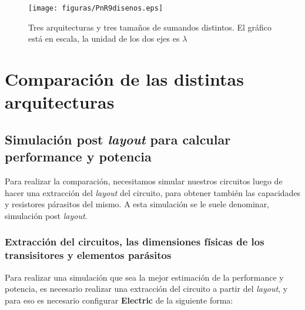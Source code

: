 \begin{figure}
\centering
\texttt{[image: figuras/PnR9disenos.eps]}
  \caption{Tres arquitecturas y tres tamaños de sumandos distintos. El gráfico está en escala, la unidad de los dos ejes es $\lambda$}
  \label{fig:diseños}
\end{figure}

\section{Comparación de las distintas arquitecturas}

\subsection{Simulación post \emph{layout} para calcular performance y potencia}
Para realizar la comparación, necesitamos simular nuestros circuitos luego de hacer una extracción del \emph{layout} del circuito, para obtener también las capacidades y resistores párasitos del mismo. A esta simulación se le suele denominar, simulación post \emph{layout}.

\subsubsection{Extracción del circuitos, las dimensiones físicas de los transisitores y elementos parásitos}

Para realizar una simulación que sea la mejor estimación de la performance y potencia, es necesario realizar una extracción del circuito a partir del \emph{layout}, y para eso es necesario configurar \textbf{Electric} de la siguiente forma:

